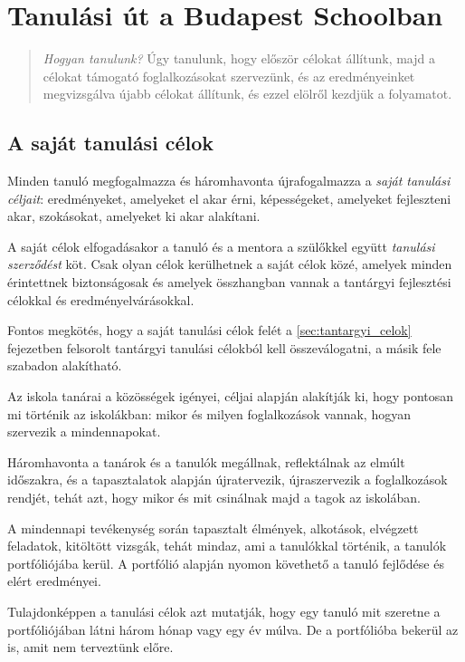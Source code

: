 \chapter{Tanulási út a Budapest Schoolban}

\begin{quote}
\emph{Hogyan tanulunk?}
Úgy tanulunk, hogy először célokat állítunk, majd a célokat támogató
foglalkozásokat szervezünk, és az eredményeinket megvizsgálva újabb
célokat állítunk, és ezzel elölről kezdjük a folyamatot.
\end{quote}

\section{A saját tanulási célok}

Minden tanuló megfogalmazza és háromhavonta újrafogalmazza a \emph{saját tanulási céljait}: eredményeket, amelyeket el akar érni, képességeket, amelyeket fejleszteni akar, szokásokat, amelyeket ki akar alakítani.

A saját célok elfogadásakor a tanuló és a mentora a szülőkkel együtt \emph{tanulási szerződést} köt. Csak olyan célok kerülhetnek a saját célok közé, amelyek minden érintettnek biztonságosak és amelyek összhangban vannak a tantárgyi fejlesztési célokkal és eredményelvárásokkal.

Fontos megkötés, hogy a saját tanulási célok felét a \ref{sec:tantargyi_celok} fejezetben felsorolt tantárgyi tanulási célokból kell összeválogatni, a másik fele szabadon alakítható.

Az iskola tanárai a közösségek igényei, céljai alapján alakítják ki, hogy pontosan mi történik az iskolákban: mikor és milyen foglalkozások vannak, hogyan szervezik a mindennapokat.

Háromhavonta a tanárok és a tanulók megállnak, reflektálnak az elmúlt időszakra, és a tapasztalatok alapján újratervezik, újraszervezik a foglalkozások rendjét, tehát azt, hogy mikor és mit csinálnak majd a tagok az iskolában.

A mindennapi tevékenység során tapasztalt élmények, alkotások, elvégzett feladatok, kitöltött vizsgák, tehát mindaz, ami a tanulókkal történik, a tanulók portfóliójába kerül. A portfólió alapján nyomon követhető a tanuló fejlődése és elért eredményei.

Tulajdonképpen a tanulási célok azt mutatják, hogy egy tanuló mit szeretne a portfóliójában látni három hónap vagy egy év múlva. De a portfólióba bekerül az is, amit nem terveztünk előre.

